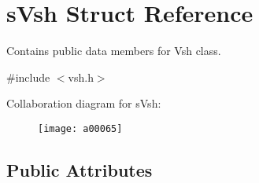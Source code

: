 \section{s\+Vsh Struct Reference}
\label{a00007}


Contains public data members for Vsh class.  




{\ttfamily \#include $<$vsh.\+h$>$}



Collaboration diagram for s\+Vsh\+:\nopagebreak
\begin{figure}[H]
\begin{center}
\leavevmode
\texttt{[image: a00065]}
\end{center}
\end{figure}
\subsection*{Public Attributes}
